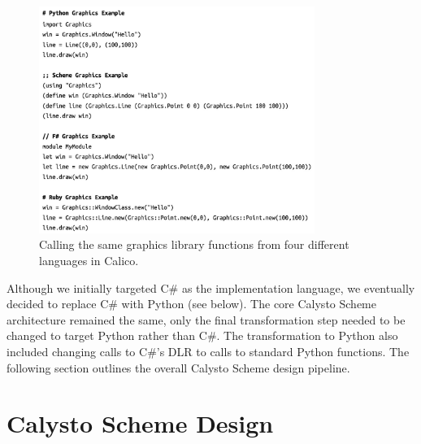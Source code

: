 \documentclass[acmsmall,screen,authorversion]{acmart}
\begin{document}

\begin{figure}[h]
  \includegraphics[width=0.8\textwidth]{graphics-scripts.jpg}
  \caption{Calling the same graphics library functions from four different languages in Calico.}
  \label{fig:scripts}
  \Description{}
\end{figure}


Although we initially targeted C\# as the implementation language, we
eventually decided to replace C\# with Python (see below). The core Calysto
Scheme architecture remained the same, only the final transformation step
needed to be changed to target Python rather than C\#. The transformation to
Python also included changing calls to C\#'s DLR to calls to standard Python
functions. The following section outlines the overall Calysto Scheme design
pipeline.


\section{Calysto Scheme Design}
\end{document}
